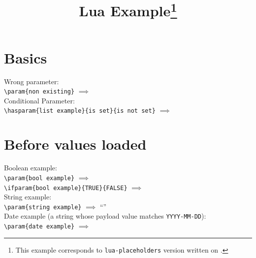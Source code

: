 \documentclass{article}
\begin{document}
    \title{Lua  Example\thanks{This example corresponds to \texttt{lua-placeholders} version \gitversion{} written on \gitdate.}}
    \author{\dogitauthors[\\]}
    \maketitle

    \section*{Basics}
    Wrong parameter:\\

    \lstinline[style=TeX,morekeywords={param}]|\param{non existing}|
    $\implies$
    \\

    Conditional Parameter:\\

    \lstinline[style=TeX,morekeywords={hasparam}]|\hasparam{list example}{is set}{is not set}|
    $\implies$

    \section*{Before values loaded}

    Boolean example:\\

    \lstinline[style=TeX,morekeywords={param}]|\param{bool example}|
    $\implies$
    \\

    \lstinline[style=TeX,morekeywords={ifparam}]|\ifparam{bool example}{TRUE}{FALSE}|
    $\implies$
    \\

    String example:\\

    \lstinline[style=TeX,morekeywords={param}]|\param{string example}|
    $\implies$
    ``''\\

    Date example (a string whose payload value matches \texttt{YYYY-MM-DD}):\\

    \lstinline[style=TeX,morekeywords={param}]|\param{date example}|
    $\implies$
    \\
\end{document}
